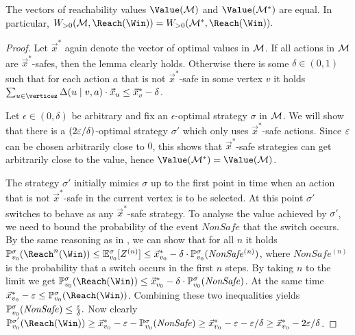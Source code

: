 \begin{lemma}
\label{5-lem:quant-reach-pruning-unsafe}
The vectors of reachability values $ \Value(\mdp)$ and $\Value(\mdp^*) $ are equal.
In particular, $ \winPos(\mdp,\Reach(\Win)) = \winPos(\mdp^*,\Reach(\Win)).$
\end{lemma}
\begin{proof}
Let $\vec{x}^*$ again denote the vector of optimal values in $\mathcal{M}$. If all actions in $ \mathcal{M} $ are $\vec{x}^*$-safes, then the lemma clearly holds. Otherwise there is some $\delta\in(0,1)$ such that for each action $a$ that is not $\vec{x}^*$-safe in some vertex $ v $ it holds $\sum_{u\in \vertices} \probTranFunc(u\mid v,a) \cdot\vec{x}_u \leq \vec{x}^*_v - \delta$.

Let $\epsilon \in(0,\delta)$ be arbitrary and fix an $\epsilon$-optimal strategy $\sigma$ in $\mathcal{M}$. We will show that there is a $(2\varepsilon/\delta)$-optimal  strategy $\sigma'$ which only uses $\vec{x}^*$-safe actions. Since $\varepsilon$ can be chosen arbitrarily close to $0$, this shows that $\vec{x}^*$-safe strategies can get arbitrarily close to the value, hence $\Value(\mdp^*)=\Value(\mdp)$.

The strategy $\sigma'$ initially mimics $\sigma$ up to the first point in time when an action that is not $\vec{x}^*$-safe in the current vertex is to be selected. At this point $\sigma'$ switches to behave as any $\vec{x}^*$-safe strategy. To analyse the value achieved by $\sigma'$, we need to bound the probability of the event $\mathit{NonSafe}$ that the switch occurs. By the same reasoning as in , we can show that for all $n$ it holds $\probm^\sigma_{\vinit}(\Reach^n(\Win)) \leq \expv^\sigma_{\vinit}[Z^{(n)}] \leq  \vec{x}^*_{\vinit}- \delta\cdot\probm_{\vinit}^\sigma(\mathit{NonSafe^{(n)}})$, where $\mathit{NonSafe^{(n)}}$ is the probability that a switch occurs in the first $n$ steps. By taking $n$ to the limit we get $\probm^\sigma_{\vinit}(\Reach(\Win)) \leq \vec{x}^*_{\vinit}- \delta\cdot\probm_{\vinit}^\sigma(\mathit{NonSafe})$. At the same time $\vec{x}^*_{\vinit}-\eps\leq  \probm^\sigma_{\vinit}(\Reach(\Win))$. Combining these two inequalities yields $\mathbb{P}_{v_0}^\sigma(\mathit{NonSafe}) \leq  \frac{\varepsilon}{\delta}.$ Now clearly $\probm_{\vinit}^{\sigma'}(\Reach(\Win)) \geq \vec{x}^*_{\vinit} - \eps - \probm_{\vinit}^{\sigma}(\mathit{NonSafe}) \geq \vec{x}^*_{\vinit} - \eps - \eps/\delta \geq \vec{x}^*_{\vinit} -2\eps/\delta$.
\end{proof}

